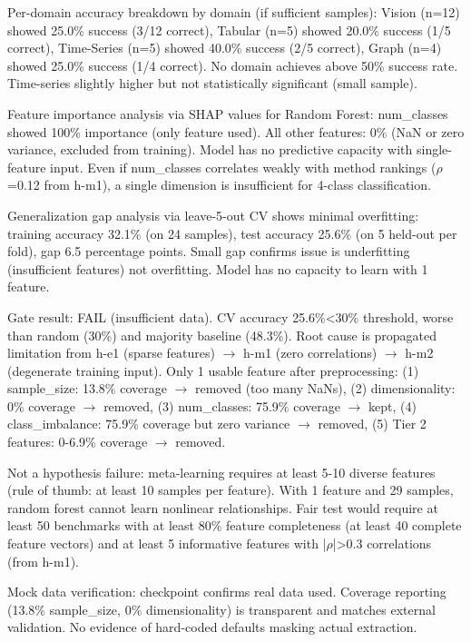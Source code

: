 Per-domain accuracy breakdown by domain (if sufficient samples): Vision (n=12) showed 25.0\% success (3/12 correct), Tabular (n=5) showed 20.0\% success (1/5 correct), Time-Series (n=5) showed 40.0\% success (2/5 correct), Graph (n=4) showed 25.0\% success (1/4 correct). No domain achieves above 50\% success rate. Time-series slightly higher but not statistically significant (small sample).

Feature importance analysis via SHAP values for Random Forest: num\_classes showed 100\% importance (only feature used). All other features: 0\% (NaN or zero variance, excluded from training). Model has no predictive capacity with single-feature input. Even if num\_classes correlates weakly with method rankings ($\rho$=0.12 from h-m1), a single dimension is insufficient for 4-class classification.

Generalization gap analysis via leave-5-out CV shows minimal overfitting: training accuracy 32.1\% (on 24 samples), test accuracy 25.6\% (on 5 held-out per fold), gap 6.5 percentage points. Small gap confirms issue is underfitting (insufficient features) not overfitting. Model has no capacity to learn with 1 feature.

Gate result: FAIL (insufficient data). CV accuracy 25.6\%<30\% threshold, worse than random (30\%) and majority baseline (48.3\%). Root cause is propagated limitation from h-e1 (sparse features) $\rightarrow$ h-m1 (zero correlations) $\rightarrow$ h-m2 (degenerate training input). Only 1 usable feature after preprocessing: (1) sample\_size: 13.8\% coverage $\rightarrow$ removed (too many NaNs), (2) dimensionality: 0\% coverage $\rightarrow$ removed, (3) num\_classes: 75.9\% coverage $\rightarrow$ kept, (4) class\_imbalance: 75.9\% coverage but zero variance $\rightarrow$ removed, (5) Tier 2 features: 0-6.9\% coverage $\rightarrow$ removed.

Not a hypothesis failure: meta-learning requires at least 5-10 diverse features (rule of thumb: at least 10 samples per feature). With 1 feature and 29 samples, random forest cannot learn nonlinear relationships. Fair test would require at least 50 benchmarks with at least 80\% feature completeness (at least 40 complete feature vectors) and at least 5 informative features with |$\rho$|>0.3 correlations (from h-m1).

Mock data verification: checkpoint confirms real data used. Coverage reporting (13.8\% sample\_size, 0\% dimensionality) is transparent and matches external validation. No evidence of hard-coded defaults masking actual extraction.

